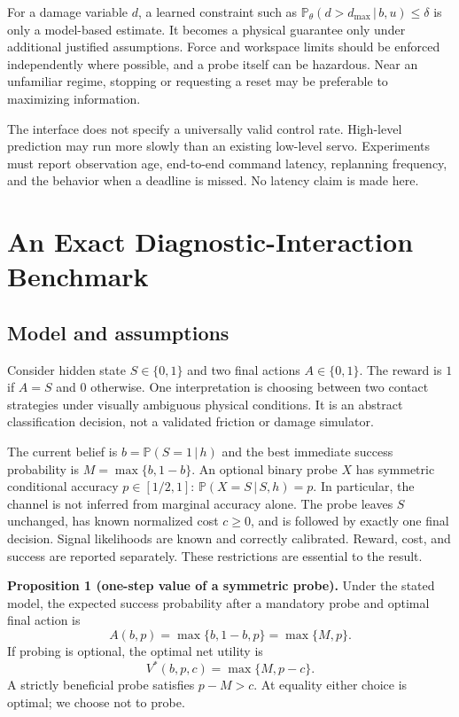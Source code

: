 \documentclass[11pt]{article}
\newcommand{\Prob}{\mathbb{P}}
\newcommand{\given}{\,\vert\,}
\begin{document}
For a damage variable $d$, a learned constraint such as
$\Prob_\theta(d>d_{\max}\given b,u)\leq\delta$ is only a model-based estimate. It becomes a physical guarantee only under additional justified assumptions. Force and workspace limits should be enforced independently where possible, and a probe itself can be hazardous. Near an unfamiliar regime, stopping or requesting a reset may be preferable to maximizing information.

The interface does not specify a universally valid control rate. High-level prediction may run more slowly than an existing low-level servo. Experiments must report observation age, end-to-end command latency, replanning frequency, and the behavior when a deadline is missed. No latency claim is made here.

\section{An Exact Diagnostic-Interaction Benchmark}
\subsection{Model and assumptions}
Consider hidden state $S\in\{0,1\}$ and two final actions $A\in\{0,1\}$. The reward is $1$ if $A=S$ and $0$ otherwise. One interpretation is choosing between two contact strategies under visually ambiguous physical conditions. It is an abstract classification decision, not a validated friction or damage simulator.

The current belief is $b=\Prob(S=1\given h)$ and the best immediate success probability is $M=\max\{b,1-b\}$. An optional binary probe $X$ has symmetric conditional accuracy $p\in[1/2,1]$: $\Prob(X=S\given S,h)=p$. In particular, the channel is not inferred from marginal accuracy alone. The probe leaves $S$ unchanged, has known normalized cost $c\geq0$, and is followed by exactly one final decision. Signal likelihoods are known and correctly calibrated. Reward, cost, and success are reported separately. These restrictions are essential to the result.

\textbf{Proposition 1 (one-step value of a symmetric probe).}
Under the stated model, the expected success probability after a mandatory probe and optimal final action is
\begin{equation}
A(b,p)=\max\{b,1-b,p\}=\max\{M,p\}.
\end{equation}
If probing is optional, the optimal net utility is
\begin{equation}
V^*(b,p,c)=\max\{M,p-c\}.
\label{eq:voi}
\end{equation}
A strictly beneficial probe satisfies $p-M>c$. At equality either choice is optimal; we choose not to probe.
\end{document}
